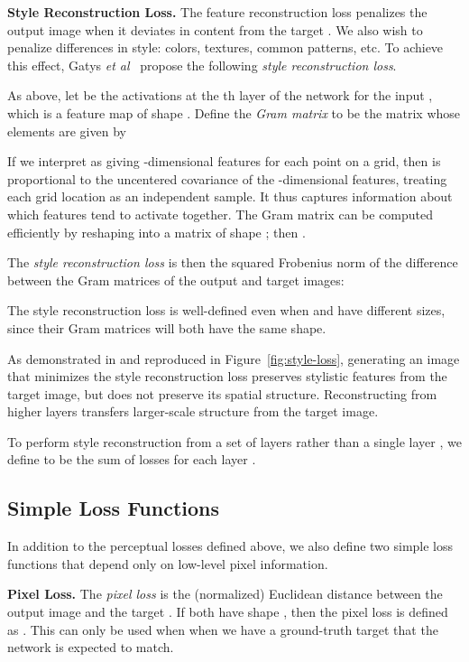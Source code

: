 \documentclass[runningheads]{llncs}
\newcommand{\etal}{\textit{et al}}
\begin{document}
\vspace{1mm}
\noindent\textbf{Style Reconstruction Loss.}
The feature reconstruction loss penalizes the output image  when it deviates in
content from the target . We also wish to penalize differences in style:
colors, textures, common patterns, etc. To achieve this effect, Gatys
\etal~\cite{Gatys2015b,gatys2015neural} propose the following \emph{style reconstruction loss}.

As above, let  be the activations at the th layer of the network 
for the input , which is a feature map of shape
. Define the \emph{Gram matrix}  to be the
 matrix whose elements are given by



If we interpret  as giving -dimensional features for each point on a
 grid, then  is proportional to the uncentered covariance of the
-dimensional features, treating each grid location as an independent sample.
It thus captures information about which features tend to activate together.
The Gram matrix can be computed efficiently by reshaping  into a matrix  of
shape ; then .

The \emph{style reconstruction loss} is then the squared Frobenius norm of the difference between
the Gram matrices of the output and target images:

The style reconstruction loss is well-defined even when  and  have different
sizes, since their Gram matrices will both have the same shape.

As demonstrated in \cite{gatys2015neural} and reproduced in Figure~\ref{fig:style-loss},
generating an image  that minimizes the style reconstruction loss preserves stylistic
features from the target image, but does not preserve its spatial structure. Reconstructing
from higher layers transfers larger-scale structure from the target image.

To perform style reconstruction from a set of layers  rather than a single layer ,
we define  to be the sum of losses for each layer .



\subsection{Simple Loss Functions}
In addition to the perceptual losses defined above, we also define two simple loss functions
that depend only on low-level pixel information.

\vspace{1mm}
\noindent \textbf{Pixel Loss.}
The \emph{pixel loss} is the (normalized) Euclidean distance between the output image
 and the target . If both have shape , then the pixel loss is
defined as . This can only be used
when when we have a ground-truth target  that the network is expected to match.
\end{document}
